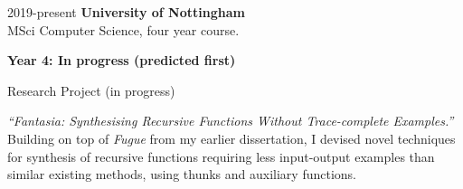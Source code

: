 \documentclass[12pt]{article}
\begin{document}
\begin{explist}
	\item[2019-present] \textbf{University of Nottingham} \\
		  MSci Computer Science, four year course.
		  {\small
		  \begin{explist}
		  	  \item[] \textbf{Year 4: \textnormal{In progress (predicted first)}}
			    \begin{explist}
			      \item Research Project (in progress)
			      \begin{explist}
			        \item \textit{``Fantasia: Synthesising Recursive Functions Without Trace-complete Examples.''} Building on top of \textit{Fugue} from my earlier dissertation, I devised novel techniques for synthesis of recursive functions requiring less input-output examples than similar existing methods, using thunks and auxiliary functions.
			        

\end{explist}
\end{explist}
\end{explist}}
\end{explist}
\end{document}

